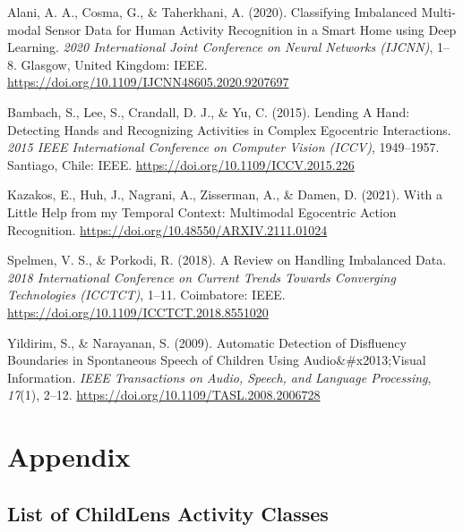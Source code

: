 \documentclass[
  man,floatsintext]{apa6}
\newlength{\cslhangindent}
\newenvironment{CSLReferences}[2] %
 {\begin{list}{}{%
  \setlength{\itemindent}{0pt}
  \setlength{\leftmargin}{0pt}
  \setlength{\parsep}{0pt}
  \ifodd #1
   \setlength{\leftmargin}{\cslhangindent}
   \setlength{\itemindent}{-1\cslhangindent}
  \fi
  \setlength{\itemsep}{#2\baselineskip}}}
 {\end{list}}
\begin{document}
\label{refs}
\begin{CSLReferences}{1}{0}
Alani, A. A., Cosma, G., \& Taherkhani, A. (2020). Classifying {Imbalanced Multi-modal Sensor Data} for {Human Activity Recognition} in a {Smart Home} using {Deep Learning}. \emph{2020 {International Joint Conference} on {Neural Networks} ({IJCNN})}, 1--8. Glasgow, United Kingdom: IEEE. \url{https://doi.org/10.1109/IJCNN48605.2020.9207697}

Bambach, S., Lee, S., Crandall, D. J., \& Yu, C. (2015). Lending {A Hand}: {Detecting Hands} and {Recognizing Activities} in {Complex Egocentric Interactions}. \emph{2015 {IEEE International Conference} on {Computer Vision} ({ICCV})}, 1949--1957. Santiago, Chile: IEEE. \url{https://doi.org/10.1109/ICCV.2015.226}

Kazakos, E., Huh, J., Nagrani, A., Zisserman, A., \& Damen, D. (2021). With a {Little Help} from my {Temporal Context}: {Multimodal Egocentric Action Recognition}. \url{https://doi.org/10.48550/ARXIV.2111.01024}

Spelmen, V. S., \& Porkodi, R. (2018). A {Review} on {Handling Imbalanced Data}. \emph{2018 {International Conference} on {Current Trends} Towards {Converging Technologies} ({ICCTCT})}, 1--11. Coimbatore: IEEE. \url{https://doi.org/10.1109/ICCTCT.2018.8551020}

Yildirim, S., \& Narayanan, S. (2009). Automatic {Detection} of {Disfluency Boundaries} in {Spontaneous Speech} of {Children Using Audio}\&\#x2013;{Visual Information}. \emph{IEEE Transactions on Audio, Speech, and Language Processing}, \emph{17}(1), 2--12. \url{https://doi.org/10.1109/TASL.2008.2006728}

\end{CSLReferences}

\endgroup

\newpage

\section{Appendix}\label{appendix}

\subsection{List of ChildLens Activity Classes}\label{list-of-childlens-activity-classes}
\end{document}
